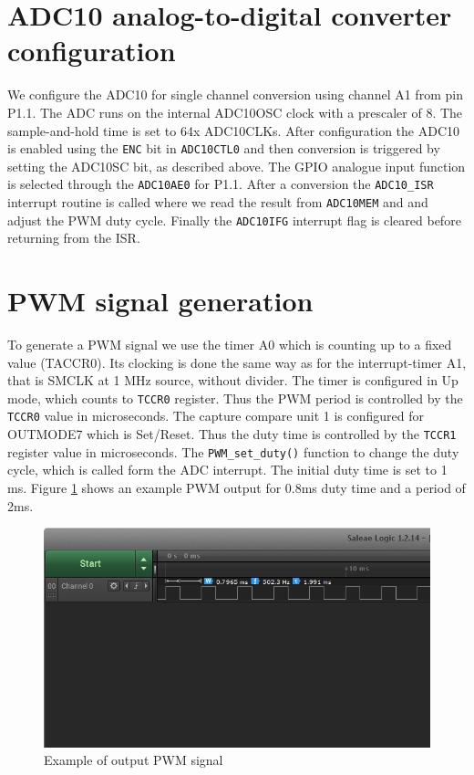 \documentclass{article}
\begin{document}
\section{ADC10 analog-to-digital converter configuration}
We configure the ADC10 for single channel conversion using channel A1 from pin P1.1. The ADC runs on the internal ADC10OSC clock with a prescaler of 8. The sample-and-hold time is set to 64x ADC10CLKs.
After configuration the ADC10 is enabled using the \verb'ENC' bit in \verb'ADC10CTL0' and then conversion is triggered by setting the ADC10SC bit, as described above.
The GPIO analogue input function is selected through the \verb'ADC10AE0' for P1.1.
After a conversion the \verb'ADC10_ISR' interrupt routine is called where we read the result from \verb'ADC10MEM' and and adjust the PWM duty cycle.
Finally the \verb'ADC10IFG' interrupt flag is cleared before returning from the ISR.

\section{PWM signal generation}

To generate a PWM signal we use the timer A0 which is counting up to a fixed value (TACCR0).
Its clocking is done the same way as for the interrupt-timer A1, that is SMCLK at 1 MHz source, without divider. The timer is configured in Up mode, which counts to \verb'TCCR0' register.
Thus the PWM period is controlled by the \verb'TCCR0' value in microseconds.
The capture compare unit 1 is configured for OUTMODE7 which is Set/Reset. Thus the duty time is controlled by the \verb'TCCR1' register value in microseconds.
The \verb'PWM_set_duty()' function to change the duty cycle, which is called form the ADC interrupt. The initial duty time is set to 1 ms.
Figure \ref{fig:pwm} shows an example PWM output for 0.8ms duty time and a period of 2ms.

\begin{figure}[H]
    \centering
    \includegraphics[scale=0.5]{images/Capture1}
    \caption{Example of output PWM signal}
    \label{fig:pwm}
\end{figure}
\end{document}
